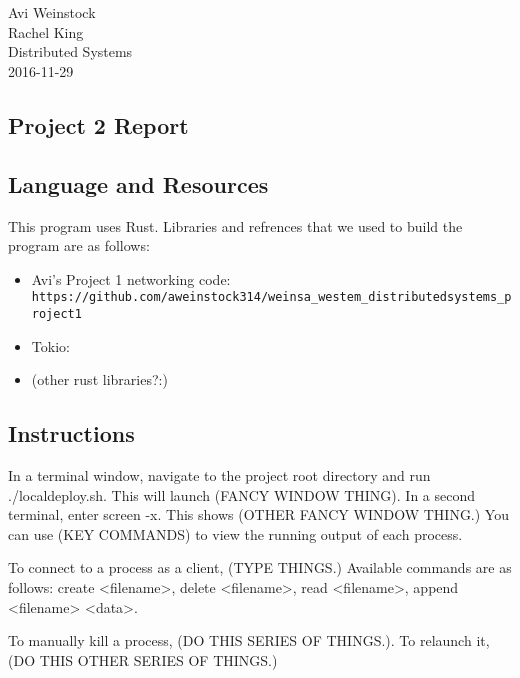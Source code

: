 \documentclass{article}
\begin{document}
\section*{}
Avi Weinstock \\
Rachel King \\
Distributed Systems\\
2016-11-29

\begin{center}
    \section*{Project 2 Report}
\end{center}

\subsection*{Language and Resources}
    This program uses Rust. Libraries and refrences that we used to build the program are as follows:
\begin{itemize}
    \item Avi's Project 1 networking code: \verb|https://github.com/aweinstock314/weinsa_westem_distributedsystems_project1|
    \item Tokio:
    \item (other rust libraries?:)
\end{itemize}
\subsection*{Instructions}
    In a terminal window, navigate to the project root directory and run ./localdeploy.sh. This will launch (FANCY WINDOW THING). In a second terminal, enter screen -x. This shows (OTHER FANCY WINDOW THING.) You can use (KEY COMMANDS) to view the running output of each process.

    To connect to a process as a client, (TYPE THINGS.) Available commands are as follows: create <filename>, delete <filename>, read <filename>, append <filename> <data>.

    To manually kill a process, (DO THIS SERIES OF THINGS.). To relaunch it, (DO THIS OTHER SERIES OF THINGS.)
\end{document}
